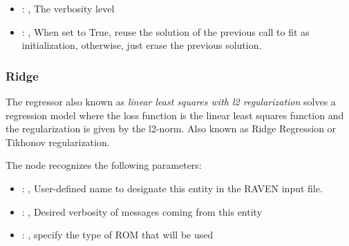 \begin{itemize}
    \item {}: ,
      The verbosity level

    \item {}: ,
      When set to True, reuse the solution of the previous call
      to fit as initialization, otherwise, just erase the previous solution.
  \end{itemize}


\subsubsection{Ridge}
  The  regressor also known as                              \textit{linear least
  squares with l2 regularization} solves a regression                              model where the
  loss function is the linear least squares function and the
  regularization is given by the l2-norm.                              Also known as Ridge
  Regression or Tikhonov regularization.

  The  node recognizes the following parameters:
    \begin{itemize}
      \item {}: ,
        User-defined name to designate this entity in the RAVEN input file.
      \item {}: ,
        Desired verbosity of messages coming from this entity
      \item {}: ,
        specify the type of ROM that will be used
  \end{itemize}

